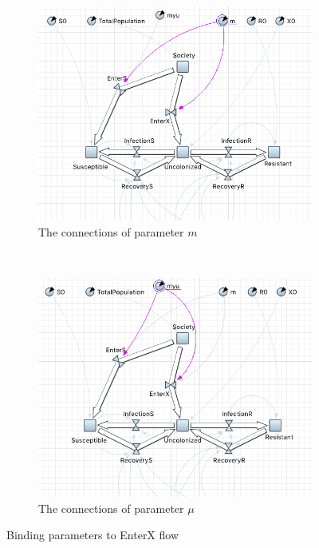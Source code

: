 \begin{figure}[H]
    \centering
    \begin{subfigure}[b]{0.48\textwidth}
        \includegraphics[width=\textwidth]{img/screens/society/society10}
        \caption{The connections of parameter $m$}
    \end{subfigure}
    ~ %
    \begin{subfigure}[b]{0.48\textwidth}
        \includegraphics[width=\textwidth]{img/screens/society/society11}
        \caption{The connections of parameter $\mu$}
    \end{subfigure}
    \caption{Binding parameters to EnterX flow}
\end{figure}

